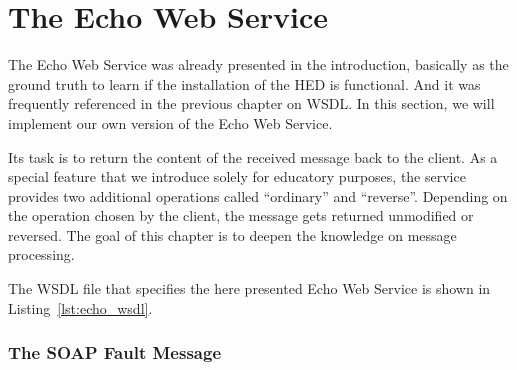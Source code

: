 \chapter{The Echo Web Service}

The Echo Web Service was already presented in the introduction, 
basically as the ground truth to learn if the installation of
the HED is functional. And it was frequently referenced in the previous chapter
on WSDL. In this section, we will implement our own version of the Echo
Web Service.

Its task is to return the content of the received message back to the client.
As a special feature that we introduce solely for educatory purposes, the
service provides two additional operations called ``ordinary'' and ``reverse''.
Depending on the operation chosen by the client, the message gets returned
unmodified or reversed. The goal of this chapter is to deepen the knowledge
on message processing.

The WSDL file that specifies the here presented Echo Web Service is shown in
Listing~\ref{lst:echo_wsdl}.



\subsection{The SOAP Fault Message}

